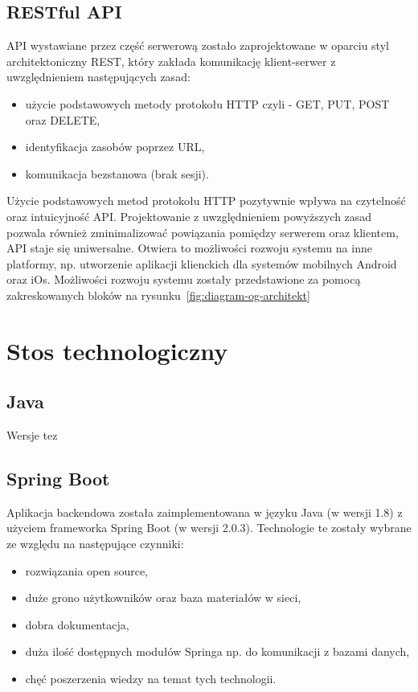 \subsection{RESTful API}
API wystawiane przez część serwerową zostało zaprojektowane w oparciu styl architektoniczny REST, który zakłada komunikację klient-serwer z uwzględnieniem następujących zasad: 
\begin{itemize}
\item użycie podstawowych metody protokołu HTTP czyli - GET, PUT, POST oraz DELETE,
\item identyfikacja zasobów poprzez URL,
\item komunikacja bezstanowa (brak sesji).
\end{itemize}

Użycie podstawowych metod protokołu HTTP pozytywnie wpływa na czytelność oraz intuicyjność API. Projektowanie z uwzględnieniem powyższych zasad pozwala również zminimalizować powiązania pomiędzy serwerem oraz klientem, API staje się uniwersalne. Otwiera to możliwości rozwoju systemu na inne platformy, np. utworzenie aplikacji klienckich dla systemów mobilnych Android oraz iOs. Możliwości rozwoju systemu zostały przedstawione za pomocą zakreskowanych bloków na rysunku~\ref{fig:diagram-og-architekt}

\section{Stos technologiczny}


\subsection{Java}

Wersje tez

\subsection{Spring Boot}

Aplikacja backendowa została zaimplementowana w języku Java (w wersji 1.8) z użyciem frameworka Spring Boot (w wersji 2.0.3). Technologie te zostały wybrane ze względu na następujące czynniki:
 \begin{itemize}
\item rozwiązania open source,
\item duże grono użytkowników oraz baza materiałów w sieci,
\item dobra dokumentacja,
\item duża ilość dostępnych modułów Springa np. do komunikacji z bazami danych,
\item chęć poszerzenia wiedzy na temat tych technologii.
\end{itemize}

